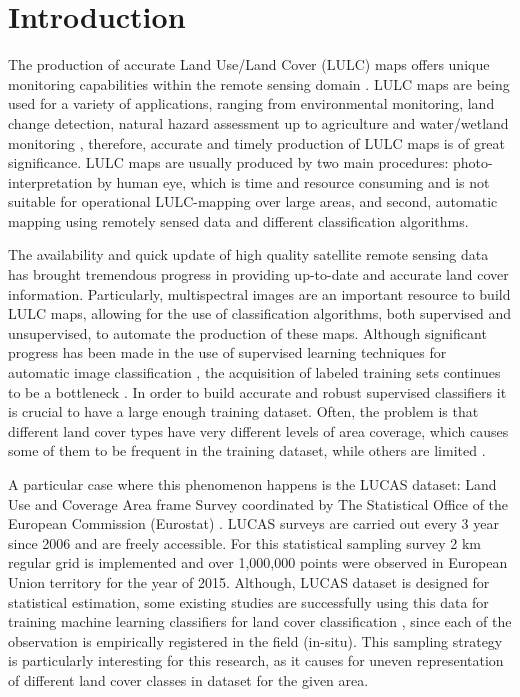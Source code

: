 \documentclass[remotesensing,article,submit,moreauthors,pdftex]{Definitions/mdpi}
\begin{document}
\section{Introduction}
The production of accurate Land Use/Land Cover (LULC) maps offers unique
monitoring capabilities within the remote sensing domain \cite{Mellor2015}. LULC
maps are being used for a variety of applications, ranging from environmental
monitoring, land change detection, natural hazard assessment up to agriculture
and water/wetland monitoring \cite{Khatami2016}, therefore, accurate and timely 
production of LULC maps is of great significance. LULC maps are usually 
produced by two main procedures: photo-interpretation by human eye, which is 
time and resource consuming and is not suitable for operational LULC-mapping 
over large areas, and second, automatic mapping using remotely sensed data and 
different classification algorithms. 

The availability and quick update of high quality satellite remote sensing data 
has brought tremendous progress in providing up-to-date and accurate land cover 
information. Particularly, multispectral images are an important resource to 
build LULC maps, allowing for the use of classification algorithms, both 
supervised and unsupervised, to automate the production of these maps. Although 
significant progress has been made in the use of supervised learning techniques 
for automatic image classification \cite{Tewkesbury2015}, the acquisition of 
labeled training sets continues to be a bottleneck \cite{Rajan2008}. In order 
to build accurate and robust supervised classifiers it is crucial to have a 
large enough training dataset. Often, the problem is that different land cover 
types have very different levels of area coverage, which causes some of them to 
be frequent in the training dataset, while others are limited \cite{Feng2019}.

A particular case where this phenomenon happens is the LUCAS dataset: Land Use
and Coverage Area frame Survey coordinated by The Statistical Office of the
European Commission (Eurostat) \cite{LUCAS2015C1}. LUCAS surveys are carried 
out every 3 year since 2006 and are freely accessible.  For this statistical
sampling survey 2 km regular grid is implemented and over 1,000,000 points were
observed in European Union territory for the year of 2015. Although, LUCAS
dataset is designed for  statistical estimation, some existing studies are
successfully using this data for training machine learning classifiers for land
cover classification \cite{Pflugmacher2019, Mack2017}, since each of the
observation is empirically registered in the field (in-situ). This sampling
strategy is particularly interesting for this research, as it causes for uneven
representation of different land cover classes in dataset for the given area.
\end{document}
